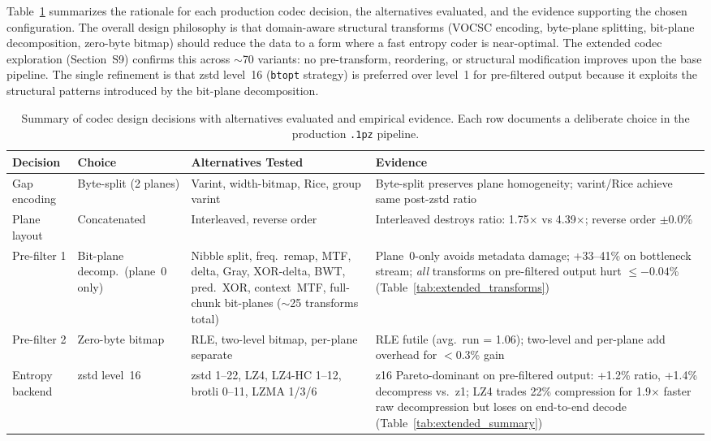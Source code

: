 \documentclass[10pt,twocolumn,letterpaper]{article}
\begin{document}
Table~\ref{tab:design_summary} summarizes the rationale for each production codec decision, the alternatives evaluated, and the evidence supporting the chosen configuration.
The overall design philosophy is that domain-aware structural transforms (VOCSC encoding, byte-plane splitting, bit-plane decomposition, zero-byte bitmap) should reduce the data to a form where a fast entropy coder is near-optimal.
The extended codec exploration (Section~S9) confirms this across $\sim$70 variants: no pre-transform, reordering, or structural modification improves upon the base pipeline.
The single refinement is that zstd level~16 (\texttt{btopt} strategy) is preferred over level~1 for pre-filtered output because it exploits the structural patterns introduced by the bit-plane decomposition.

\begin{table}[h]
\centering
\caption{Summary of codec design decisions with alternatives evaluated and empirical evidence. Each row documents a deliberate choice in the production \texttt{.1pz} pipeline.}
\label{tab:design_summary}
\footnotesize
\begin{tabular}{p{2.8cm} p{2.2cm} p{3.5cm} p{5.5cm}}
\toprule
Decision & Choice & Alternatives Tested & Evidence \\
\midrule
Gap encoding & Byte-split (2 planes) & Varint, width-bitmap, Rice, group varint & Byte-split preserves plane homogeneity; varint/Rice achieve same post-zstd ratio \\[3pt]
Plane layout & Concatenated & Interleaved, reverse order & Interleaved destroys ratio: 1.75$\times$ vs 4.39$\times$; reverse order $\pm$0.0\% \\[3pt]
Pre-filter 1 & Bit-plane decomp.\ (plane~0 only) & Nibble split, freq.\ remap, MTF, delta, Gray, XOR-delta, BWT, pred.\ XOR, context~MTF, full-chunk bit-planes ($\sim$25 transforms total) & Plane~0-only avoids metadata damage; +33--41\% on bottleneck stream; \emph{all} transforms on pre-filtered output hurt $\leq -0.04$\% (Table~\ref{tab:extended_transforms}) \\[3pt]
Pre-filter 2 & Zero-byte bitmap & RLE, two-level bitmap, per-plane separate & RLE futile (avg.\ run = 1.06); two-level and per-plane add overhead for $<$0.3\% gain \\[3pt]
Entropy backend & zstd level~16 & zstd 1--22, LZ4, LZ4-HC 1--12, brotli 0--11, LZMA 1/3/6 & z16 Pareto-dominant on pre-filtered output: +1.2\% ratio, +1.4\% decompress vs.\ z1; LZ4 trades 22\% compression for 1.9$\times$ faster raw decompression but loses on end-to-end decode (Table~\ref{tab:extended_summary}) \\[3pt]

\end{tabular}
\end{table}
\end{document}
